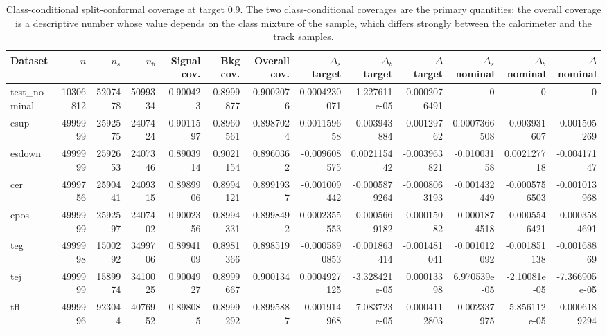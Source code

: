 \begin{landscape}
\begin{table}[p]
\centering
\footnotesize
\setlength{\tabcolsep}{3pt}
\caption{Class-conditional split-conformal coverage at target $0.9$. The two class-conditional coverages are the primary quantities; the overall coverage is a descriptive number whose value depends on the class mixture of the sample, which differs strongly between the calorimeter and the track samples.}
\label{tab:supp-conformal-coverage}
\begin{tabular}{l rrr rrr rrr rrr}
\toprule
Dataset & $n$ & $n_s$ & $n_b$ & Signal cov. & Bkg cov. & Overall cov. & $\Delta_s$ target & $\Delta_b$ target & $\Delta$ target & $\Delta_s$ nominal & $\Delta_b$ nominal & $\Delta$ nominal \\
\midrule
test\_nominal & 10306812 & 5207478 & 5099334 & 0.900423 & 0.8999877 & 0.9002076 & 0.0004230071 & -1.227611e-05 & 0.0002076491 & 0 & 0 & 0 \\
esup & 4999999 & 2592575 & 2407424 & 0.9011597 & 0.8960561 & 0.8987024 & 0.001159658 & -0.003943884 & -0.00129762 & 0.0007366508 & -0.003931607 & -0.001505269 \\
esdown & 4999999 & 2592653 & 2407346 & 0.8903914 & 0.9021154 & 0.8960362 & -0.009608575 & 0.002115442 & -0.003963821 & -0.01003158 & 0.002127718 & -0.00417147 \\
cer & 4999756 & 2590441 & 2409315 & 0.8989906 & 0.8994121 & 0.8991937 & -0.001009442 & -0.0005879264 & -0.0008063193 & -0.001432449 & -0.0005756503 & -0.001013968 \\
cpos & 4999999 & 2592597 & 2407402 & 0.9002356 & 0.8994331 & 0.8998492 & 0.0002355553 & -0.0005669182 & -0.00015082 & -0.0001874518 & -0.0005546421 & -0.0003584691 \\
teg & 4999998 & 1500292 & 3499706 & 0.8994109 & 0.8981366 & 0.898519 & -0.0005890853 & -0.001863414 & -0.001481041 & -0.001012092 & -0.001851138 & -0.00168869 \\
tej & 4999999 & 1589974 & 3410025 & 0.9004927 & 0.8999667 & 0.900134 & 0.0004927125 & -3.328421e-05 & 0.00013398 & 6.970539e-05 & -2.10081e-05 & -7.366905e-05 \\
tfl & 4999996 & 923044 & 4076952 & 0.898085 & 0.8999292 & 0.8995887 & -0.001914968 & -7.083723e-05 & -0.0004112803 & -0.002337975 & -5.856112e-05 & -0.0006189294 \\

\end{tabular}
\end{table}
\end{landscape}
